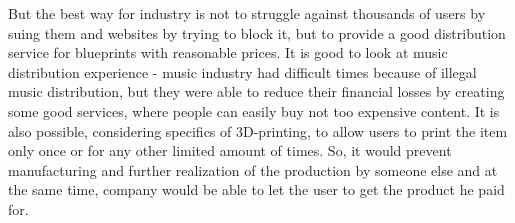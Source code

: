 But the best way for industry is not to struggle against thousands of users by suing them and websites by trying to block it, but to provide a good distribution service for blueprints with reasonable prices.
It is good to look at music distribution experience - music industry had difficult times because of illegal music distribution, but they were able to reduce their financial losses by creating some good services, where people can easily buy not too expensive content.
It is also possible, considering specifics of 3D-printing, to allow users to print the item only once or for any other limited amount of times.
So, it would prevent manufacturing and further realization of the production by someone else and at the same time, company would be able to let the user to get the product he paid for.
